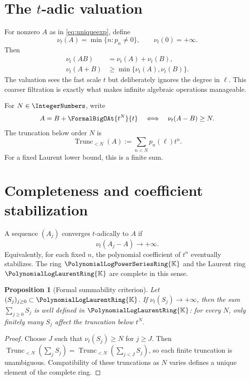 \documentclass[11pt,oneside,openany]{book}
\newtheorem{proposition}[theorem]{Proposition}
\newcommand{\K}{\mathbb{K}}
\newcommand{\Rring}{\PolynomialLogPowerSeriesRing{\K}}
\newcommand{\Pring}{\PolynomialLogLaurentRing{\K}}
\newcommand{\ordt}{\nu_t}
\newcommand{\TransseriesTruncateBelow}[2]{%
  \operatorname{Trunc}_{<#2}\!\left(#1\right)%
}
\begin{document}
\section{The \texorpdfstring{\(t\)}{t}-adic valuation}
For nonzero \(A\) as in \cref{eq:uniqueexp}, define
\begin{equation}\label{eq:valuation}
  \ordt(A)=\min\{n:p_n\neq0\},
  \qquad
  \ordt(0)=+\infty.
\end{equation}
Then
\begin{align}
 \ordt(AB)&=\ordt(A)+\ordt(B),\label{eq:valprod}\\
 \ordt(A+B)&\geq\min\{\ordt(A),\ordt(B)\}.
 \label{eq:valsum}
\end{align}
The valuation sees the fast scale \(t\) but deliberately ignores the degree in
\(\ell\).  This coarser filtration is exactly what makes infinite algebraic
operations manageable.

For \(N\in\IntegerNumbers\), write
\[
  A=B+\FormalBigOAt{t^N}{t}
  \quad\Longleftrightarrow\quad
  \ordt(A-B)\geq N.
\]
The truncation below order \(N\) is
\begin{equation}\label{eq:truncdef}
  \TransseriesTruncateBelow{A}{N}:=\sum_{n<N}p_n(\ell)t^n.
\end{equation}
For a fixed Laurent lower bound, this is a finite sum.

\section{Completeness and coefficient stabilization}
A sequence \((A_j)\) converges \(t\)-adically to \(A\) if
\[
  \ordt(A_j-A)\longrightarrow+\infty.
\]
Equivalently, for each fixed \(n\), the polynomial coefficient of \(t^n\)
eventually stabilizes.  The ring \(\Rring\) and the Laurent ring \(\Pring\) are
complete in this sense.

\begin{proposition}[Formal summability criterion]\label{prop:summability}
Let \((S_j)_{j\geq0}\subset\Pring\).  If
\(\ordt(S_j)\to+\infty\), then the sum \(\sum_{j\geq0}S_j\) is well defined in
\(\Pring\): for every \(N\), only finitely many \(S_j\) affect the truncation
below \(t^N\).
\end{proposition}

\begin{proof}
Choose \(J\) such that \(\ordt(S_j)\geq N\) for \(j\geq J\).  Then
\(\TransseriesTruncateBelow{\sum_jS_j}{N}
=\TransseriesTruncateBelow{\sum_{j<J}S_j}{N}\), so each finite truncation is
unambiguous.  Compatibility of these truncations as \(N\) varies defines a
unique element of the complete ring.
\end{proof}
\end{document}
